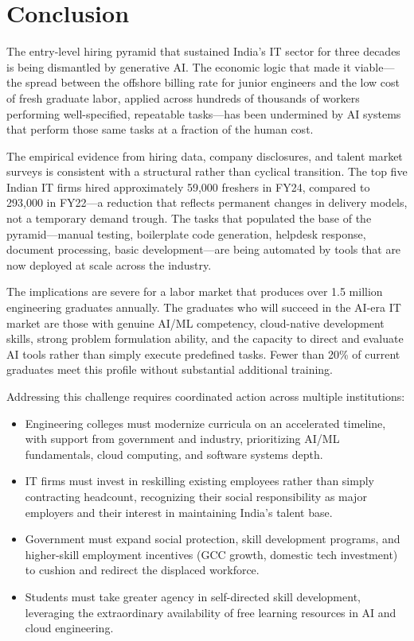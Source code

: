 \documentclass[conference]{IEEEtran}
\begin{document}
\section{Conclusion}
\label{sec:conclusion}

The entry-level hiring pyramid that sustained India's IT sector for three decades is being dismantled by generative AI. The economic logic that made it viable---the spread between the offshore billing rate for junior engineers and the low cost of fresh graduate labor, applied across hundreds of thousands of workers performing well-specified, repeatable tasks---has been undermined by AI systems that perform those same tasks at a fraction of the human cost.

The empirical evidence from hiring data, company disclosures, and talent market surveys is consistent with a structural rather than cyclical transition. The top five Indian IT firms hired approximately 59,000 freshers in FY24, compared to 293,000 in FY22---a reduction that reflects permanent changes in delivery models, not a temporary demand trough. The tasks that populated the base of the pyramid---manual testing, boilerplate code generation, helpdesk response, document processing, basic development---are being automated by tools that are now deployed at scale across the industry.

The implications are severe for a labor market that produces over 1.5 million engineering graduates annually. The graduates who will succeed in the AI-era IT market are those with genuine AI/ML competency, cloud-native development skills, strong problem formulation ability, and the capacity to direct and evaluate AI tools rather than simply execute predefined tasks. Fewer than 20\% of current graduates meet this profile without substantial additional training.

Addressing this challenge requires coordinated action across multiple institutions:

\begin{itemize}
    \item Engineering colleges must modernize curricula on an accelerated timeline, with support from government and industry, prioritizing AI/ML fundamentals, cloud computing, and software systems depth.
    \item IT firms must invest in reskilling existing employees rather than simply contracting headcount, recognizing their social responsibility as major employers and their interest in maintaining India's talent base.
    \item Government must expand social protection, skill development programs, and higher-skill employment incentives (GCC growth, domestic tech investment) to cushion and redirect the displaced workforce.
    \item Students must take greater agency in self-directed skill development, leveraging the extraordinary availability of free learning resources in AI and cloud engineering.
\end{itemize}
\end{document}
